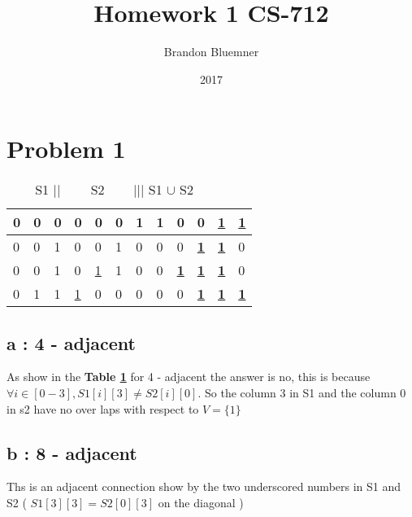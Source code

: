\documentclass[12pt]{article}
\begin{document}
\title{Homework 1 CS-712}
\author{Brandon Bluemner}
\date{2017}
\maketitle

    \section{Problem 1}
      
        \begin{table}
        \centering
        \caption{S1 $   || \quad \quad   $ S2 $ \quad \ \ \ \ |||  $ S1 $\cup$ S2 $ \quad \quad $}


         \begin{tabular}{ | l | l | l | l | | l | l | l | l | | | l | l | l | l | }
            
            \hline
            0 & 0 & 0 & 0 &   0 & 0 & 1 & 1 &                        0 & 0 & \underline{\textbf{1}} & \underline{\textbf{1}}\\\hline
            0 & 0 & 1 & 0 &   0 & 1 & 0 & 0 &                        0 & \underline{\textbf{1}} & \underline{\textbf{1}} & 0\\\hline
            0 & 0 & 1 & 0 &   \underline{1} & 1 & 0 & 0 &   \underline{\textbf{1}} & \underline{\textbf{1}} & \underline{\textbf{1}} & 0\\\hline
            0 & 1 & 1 & \underline{1} &   0 & 0 & 0 & 0 &   0 & \underline{\textbf{1}} & \underline{\textbf{1}} & \underline{\textbf{1}}\\\hline
            \end{tabular}
            \label{tab:table1}
        \end{table}

        \subsection{a : 4 - adjacent}
        As show in the  \textbf{ Table \ref{tab:table1}} for 4 - adjacent the answer is no, 
        this is because $\forall i \in [0-3],   S1[i][3] \neq S2[i][0]$. 
        So the column 3 in S1 and the column 0 in s2 have no over laps with 
        respect to $V=\{1\}$

        \subsection{b : 8 - adjacent}
        Ths is an adjacent connection  show by the two underscored numbers
        in S1 and S2 ( $S1[3][3] = S2[0][3]$ on the diagonal )
\end{document}
